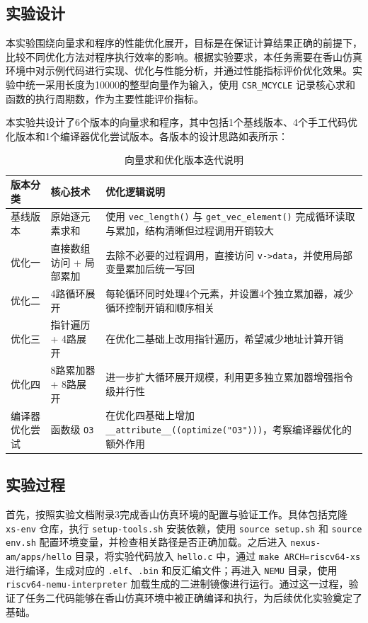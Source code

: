\subsection{实验设计}
本实验围绕向量求和程序的性能优化展开，目标是在保证计算结果正确的前提下，比较不同优化方法对程序执行效率的影响。根据实验要求，本任务需要在香山仿真环境中对示例代码进行实现、优化与性能分析，并通过性能指标评价优化效果。实验中统一采用长度为10000的整型向量作为输入，使用 \texttt{CSR\_MCYCLE} 记录核心求和函数的执行周期数，作为主要性能评价指标。

本实验共设计了6个版本的向量求和程序，其中包括1个基线版本、4个手工代码优化版本和1个编译器优化尝试版本。各版本的设计思路如表所示：

\begin{table}[H]
\centering
\caption{向量求和优化版本迭代说明}
\begin{tabular}{lll}
\toprule
版本分类 & 核心技术 & 优化逻辑说明 \\
\midrule
基线版本 & 原始逐元素求和 & 使用 \texttt{vec\_length()} 与 \texttt{get\_vec\_element()} 完成循环读取与累加，结构清晰但过程调用开销较大 \\
优化一 & 直接数组访问 + 局部累加 & 去除不必要的过程调用，直接访问 \texttt{v->data}，并使用局部变量累加后统一写回 \\
优化二 & 4路循环展开 & 每轮循环同时处理4个元素，并设置4个独立累加器，减少循环控制开销和顺序相关 \\
优化三 & 指针遍历 + 4路展开 & 在优化二基础上改用指针遍历，希望减少地址计算开销 \\
优化四 & 8路累加器 + 8路展开 & 进一步扩大循环展开规模，利用更多独立累加器增强指令级并行性 \\
编译器优化尝试 & 函数级 \texttt{O3} & 在优化四基础上增加 \texttt{\_\_attribute\_\_((optimize("O3")))}，考察编译器优化的额外作用 \\
\bottomrule
\end{tabular}
\end{table}

\subsection{实验过程}
首先，按照实验文档附录3完成香山仿真环境的配置与验证工作。具体包括克隆 \texttt{xs-env} 仓库，执行 \texttt{setup-tools.sh} 安装依赖，使用 \texttt{source setup.sh} 和 \texttt{source env.sh} 配置环境变量，并检查相关路径是否正确加载。之后进入 \texttt{nexus-am/apps/hello} 目录，将实验代码放入 \texttt{hello.c} 中，通过 \texttt{make ARCH=riscv64-xs} 进行编译，生成对应的 \texttt{.elf}、\texttt{.bin} 和反汇编文件；再进入 \texttt{NEMU} 目录，使用 \texttt{riscv64-nemu-interpreter} 加载生成的二进制镜像进行运行。通过这一过程，验证了任务二代码能够在香山仿真环境中被正确编译和执行，为后续优化实验奠定了基础。

